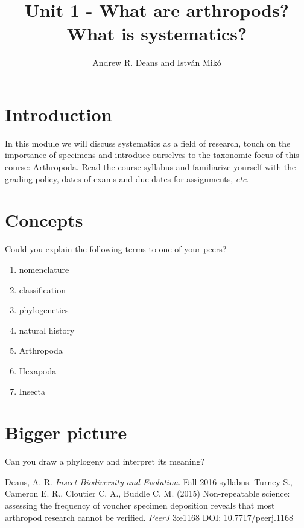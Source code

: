 \documentclass[11pt,letterpaper]{article}
\title{Unit 1 - What are arthropods? What is systematics?}
\author{Andrew R. Deans and Istv\'an Mik\'o}
\begin{document}
\cleanlookdateon %
\maketitle
\thispagestyle{fancy}
\section*{Introduction}
In this module we will discuss systematics as a field of research, touch on the importance of specimens \cite{voucher} and introduce ourselves to the taxonomic focus of this course: Arthropoda. Read the course syllabus \cite{syllabus} and familiarize yourself with the grading policy, dates of exams and due dates for assignments, \textit{etc}.

\section*{Concepts}
Could you explain the following terms to one of your peers?

\begin{enumerate} 
\item{nomenclature} 
\item{classification}  
\item{phylogenetics}  
\item{natural history}
\item{Arthropoda}  
\item{Hexapoda}  
\item{Insecta}  
\end{enumerate}

\section*{Bigger picture}
Can you draw a phylogeny and interpret its meaning?

\begin{thebibliography}{9}%
 Deans, A. R. \textit{Insect Biodiversity and Evolution}. Fall 2016 syllabus.
 Turney S., Cameron E. R., Cloutier C. A., Buddle C. M. (2015) Non-repeatable science: assessing the frequency of voucher specimen deposition reveals that most arthropod research cannot be verified. \textit{PeerJ} 3:e1168 DOI: 10.7717/peerj.1168
\end{thebibliography}
\end{document}
